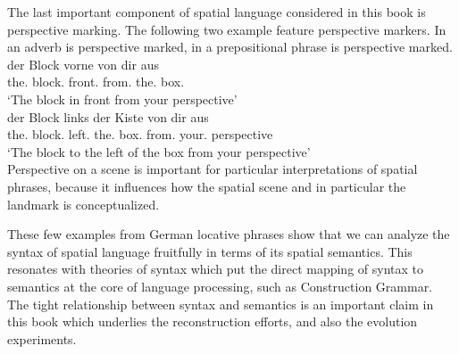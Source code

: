 The last important component of spatial language considered in this book
is perspective marking. The following two example feature perspective markers. In  an adverb is perspective marked, in  a prepositional
phrase is perspective marked.
\ea
\label{e:5:der-block-vorne-von-dir-aus}
\gll der Block vorne von dir aus\\
the.{\NOM} block.{\NOM} front.{\ADV} from.{\PREP} the.{\DAT} box.{\DAT} \\
\glt `The block in front from your perspective'\\
\z
\ea
\label{e:5:der-block-links-der-kiste-von-dir-aus}
\gll der Block links der Kiste von dir aus\\
the.{\NOM} block.{\NOM} left.{\PREP} the.{\GEN} box.{\GEN} from.{\PREP} your.{\DAT} perspective\\
\glt `The block to the left of the box from your perspective'\\
\z
Perspective on a scene is important for particular interpretations
of spatial phrases, because it influences how the spatial scene and in 
particular the landmark is conceptualized. 



These few examples from German locative phrases show that 
we can analyze the syntax of spatial language 
fruitfully in terms of its spatial semantics. This resonates with 
theories of syntax which put the direct
mapping of syntax to semantics at the core of language processing, such as Construction Grammar.
The tight relationship between syntax and semantics is an important 
claim in this book which underlies the reconstruction efforts, and also
the evolution experiments. 


